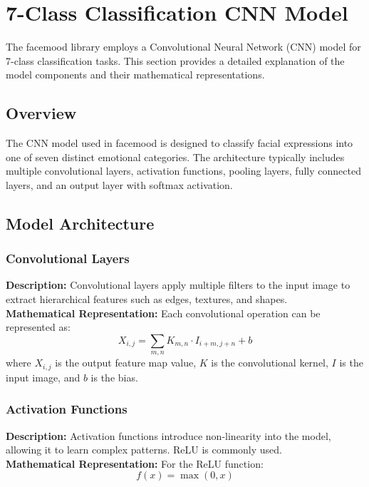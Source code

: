 \documentclass{article}
\begin{document}
\vspace{5cm}

\section{7-Class Classification CNN Model}

The facemood library employs a Convolutional Neural Network (CNN) model for 7-class classification tasks. This section provides a detailed explanation of the model components and their mathematical representations.

\subsection{Overview}
The CNN model used in facemood is designed to classify facial expressions into one of seven distinct emotional categories. The architecture typically includes multiple convolutional layers, activation functions, pooling layers, fully connected layers, and an output layer with softmax activation.

\subsection{Model Architecture}

\subsubsection{Convolutional Layers}
\textbf{Description:} Convolutional layers apply multiple filters to the input image to extract hierarchical features such as edges, textures, and shapes. \\
\textbf{Mathematical Representation:} 
Each convolutional operation can be represented as:
\begin{equation}
    X_{i,j} = \sum_{m,n} K_{m,n} \cdot I_{i+m,j+n} + b
\end{equation}
where \( X_{i,j} \) is the output feature map value, \( K \) is the convolutional kernel, \( I \) is the input image, and \( b \) is the bias.

\subsubsection{Activation Functions}
\textbf{Description:} Activation functions introduce non-linearity into the model, allowing it to learn complex patterns. ReLU is commonly used. \\
\textbf{Mathematical Representation:}
For the ReLU function:
\begin{equation}
    f(x) = \max(0, x)
\end{equation}
\end{document}
